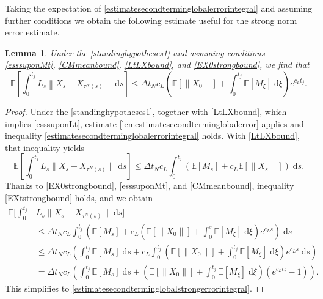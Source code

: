 \documentclass[reqno,12pt]{amsart}
\theoremstyle{plain} %
\newtheorem{lemma}{Lemma}[section]
\theoremstyle{definition} %
\begin{document}
Taking the expectation of \eqref{estimatesecondterminglobalerrorintegral} and assuming further conditions we obtain the following estimate useful for the strong norm error estimate.

\begin{lemma}
    Under the \cref{standinghypotheses1} and assuming conditions \eqref{esssuponMt}, \eqref{CMmeanbound}, \eqref{LtLXbound}, and \eqref{EX0strongbound}, we find that
    \begin{equation}
        \label{estimatesecondterminglobalstrongerrorintegral}
        \mathbb{E}\left[\int_0^{t_j}L_s\left\|X_s - X_{\tau^N(s)}\right\| \;\mathrm{d}s\right] \leq \Delta t_N c_L \left(\mathbb{E}[\|X_0\|] + \int_0^{t_j} \mathbb{E}[M_\xi]\;\mathrm{d}\xi\right)e^{c_L t_j}.
    \end{equation}
\end{lemma}

\begin{proof}    
    Under the \cref{standinghypotheses1}, together with \eqref{LtLXbound}, which implies \eqref{esssuponLt}, estimate \cref{lemestimatesecondterminglobalerror} applies and inequality \eqref{estimatesecondterminglobalerrorintegral} holds.
    With \eqref{LtLXbound}, that inequality yields
    \[
        \mathbb{E}\left[\int_0^{t_j} L_s\|X_s - X_{\tau^N(s)}\| \;\mathrm{d}s \right] \leq \Delta t_N c_L \int_0^{t_j} (\mathbb{E}[M_s] + c_L\mathbb{E}[\|X_s\|]) \;\mathrm{d}s.
    \]
    Thanks to \eqref{EX0strongbound}, \eqref{esssuponMt}, and \eqref{CMmeanbound}, inequality \eqref{EXtstrongbound} holds, and we obtain
    \begin{align*}
        \mathbb{E}\bigg[\int_0^{t_j} & L_s \|X_s - X_{\tau^N(s)}\| \;\mathrm{d}s\bigg] \\
        & \leq \Delta t_N c_L \int_0^{t_j} \left(\mathbb{E}[M_s] + c_L\left(\mathbb{E}[\|X_0\|] + \int_0^s \mathbb{E}[M_\xi]\;\mathrm{d}\xi\right)e^{c_L s} \right)\;\mathrm{d}s \\
        & \leq \Delta t_N c_L \left(\int_0^{t_j} \mathbb{E}[M_s] \;\mathrm{d}s + c_L \int_0^{t_j}\left(\mathbb{E}[\|X_0\|] + \int_0^{t_j} \mathbb{E}[M_\xi]\;\mathrm{d}\xi\right)e^{c_L s} \;\mathrm{d}s\right) \\
        & = \Delta t_N c_L \left(\int_0^{t_j} \mathbb{E}[M_s] \;\mathrm{d}s + \left(\mathbb{E}[\|X_0\|] + \int_0^{t_j} \mathbb{E}[M_\xi]\;\mathrm{d}\xi\right)\left(e^{c_L t_j} - 1\right) \right).
    \end{align*}
    This simplifies to \eqref{estimatesecondterminglobalstrongerrorintegral}.
\end{proof}
\end{document}
